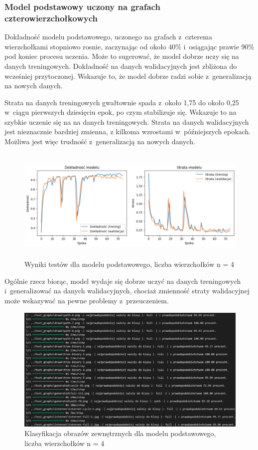 \subsubsection{Model podstawowy uczony na grafach czterowierzchołkowych}

Dokładność modelu podstawowego, uczonego na grafach z~czterema wierzchołkami stopniowo rosnie,
zaczynając od około 40\% i~osiągając prawie 90\% pod koniec procesu uczenia.
Może to sugerować, że model dobrze uczy się na danych treningowych.
Dokładność na danych walidacyjnych jest zbliżona do wcześniej przytoczonej.
Wskazuje to, że model dobrze radzi sobie z~generalizacją na nowych danych.

Strata na danych treningowych gwałtownie spada z~około 1,75 do około 0,25 w~ciągu pierwszych dziesięciu epok,
po czym stabilizuje się.
Wskazuje to na szybkie uczenie się na na danych treningowych.
Strata na danych walidacyjnych jest nieznacznie bardziej zmienna,
z kilkoma wzrostami w~późniejszych epokach.
Możliwa jest więc trudność z~generalizacją na nowych danych.

\begin{figure}[ht]
	\centering
	\includegraphics[height=5.5cm]{resources/tests/images/v3/base4_img.png}
	\caption{Wyniki testów dla modelu podstawowego, liczba wierzchołków n = 4}
	\label{Fig:tests-base-1a}
\end{figure}
\FloatBarrier

Ogólnie rzecz biorąc, model wydaje się dobrze uczyć na danych treningowych i~generalizować na danych walidacyjnych,
chociaż zmienność straty walidacyjnej może wskazywać na pewne problemy z~przeuczeniem.

\begin{figure}[ht]
	\centering
	\includegraphics[width=14cm]{resources/tests/images/v3/base4_txt.png}
	\caption{Klasyfikacja obrazów zewnętrznych dla modelu podstawowego, liczba wierzchołków n = 4}
	\label{Fig:tests-base-1b}
\end{figure}
\FloatBarrier

